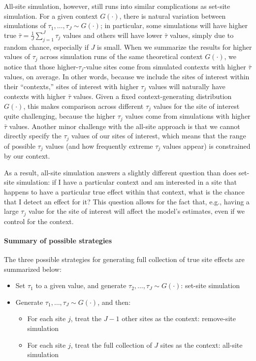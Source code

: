 \documentclass[]{article}
\begin{document}
All-site simulation, however, still runs into similar complications as set-site simulation.
For a given context $G(\cdot)$, there is natural variation between simulations of $\tau_1, \dots, \tau_J \sim G(\cdot)$; in particular, some simulations will have higher true $\bar{\tau} = \frac{1}{J} \sum_{j=1}^J \tau_j$ values and others will have lower $\bar{\tau}$ values, simply due to random chance, especially if $J$ is small.
When we summarize the results for higher values of $\tau_j$ across simulation runs of the same theoretical context $G(\cdot)$, we notice that those higher-$\tau_j$-value sites come from simulated contexts with higher $\bar{\tau}$ values, on average.
In other words, because we include the sites of interest within their ``contexts,'' sites of interest with higher $\tau_j$ values will naturally have contexts with higher $\bar{\tau}$ values.
Given a fixed context-generating distribution $G(\cdot)$, this makes comparison across different $\tau_j$ values for the site of interest quite challenging, because the higher $\tau_j$ values come from simulations with higher $\bar{\tau}$ values.
Another minor challenge with the all-site approach is that we cannot directly specify the $\tau_j$ values of our sites of interest, which means that the range of possible $\tau_j$ values (and how frequently extreme $\tau_j$ values appear) is constrained by our context.

As a result, all-site simulation answers a slightly different question than does set-site simulation: if I have a particular context and am interested in a site that happens to have a particular true effect within that context, what is the chance that I detect an effect for it?
This question allows for the fact that, e.g., having a large $\tau_j$ value for the site of interest will affect the model's estimates, even if we control for the context.

\paragraph{Summary of possible strategies} The three possible strategies for generating full collection of true site effects are summarized below:
\begin{itemize}
	\item Set $\tau_1$ to a given value, and generate $\tau_2, \dots, \tau_J \sim G(\cdot)$: set-site simulation
	\item Generate $\tau_1, \dots, \tau_J \sim G(\cdot)$, and then:
	\begin{itemize}
		\item For each site $j$, treat the $J-1$ other sites as the context: remove-site simulation
		\item For each site $j$, treat the full collection of $J$ sites as the context: all-site simulation
	\end{itemize}
\end{itemize}
\end{document}
